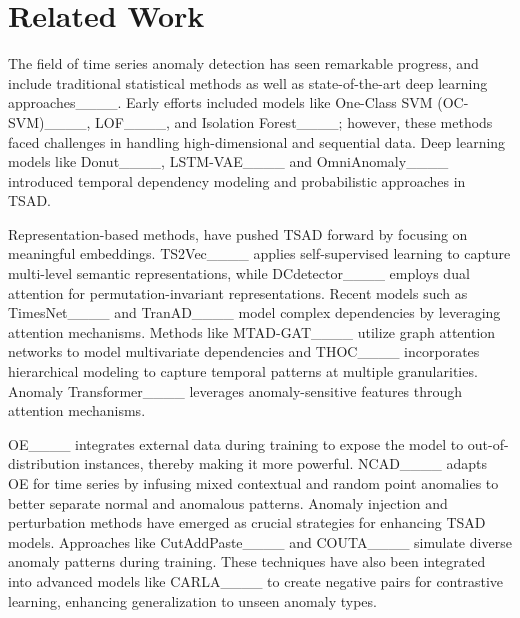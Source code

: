 \section{Related Work}
The field of time series anomaly detection has seen remarkable progress, and include  traditional statistical methods as well as state-of-the-art deep learning approaches____. Early efforts included models like One-Class SVM (OC-SVM)____, LOF____, and Isolation Forest____; however, these methods faced challenges in handling high-dimensional and sequential data. Deep learning models like Donut____, LSTM-VAE____ and OmniAnomaly____ introduced temporal dependency modeling and probabilistic approaches in TSAD.

\sloppy
Representation-based methods, have pushed TSAD forward by focusing on meaningful embeddings. TS2Vec____ applies self-supervised learning to capture multi-level semantic representations, while DCdetector____ employs dual attention for permutation-invariant representations. Recent models such as TimesNet____ and TranAD____ model complex dependencies by leveraging attention mechanisms. Methods like MTAD-GAT____ utilize graph attention networks to model multivariate dependencies and THOC____ incorporates hierarchical modeling to capture temporal patterns at multiple granularities. Anomaly Transformer____ leverages anomaly-sensitive features through attention mechanisms.

OE____ integrates external data during training to expose the model to out-of-distribution instances, thereby making it more powerful. NCAD____ adapts OE for time series by infusing mixed contextual and random point anomalies to better separate normal and anomalous patterns.
Anomaly injection and perturbation methods have emerged as crucial strategies for enhancing TSAD models. Approaches like CutAddPaste____ and COUTA____ simulate diverse anomaly patterns during training. These techniques have also been integrated into advanced models like CARLA____ to create negative pairs for contrastive learning, enhancing generalization to unseen anomaly types.